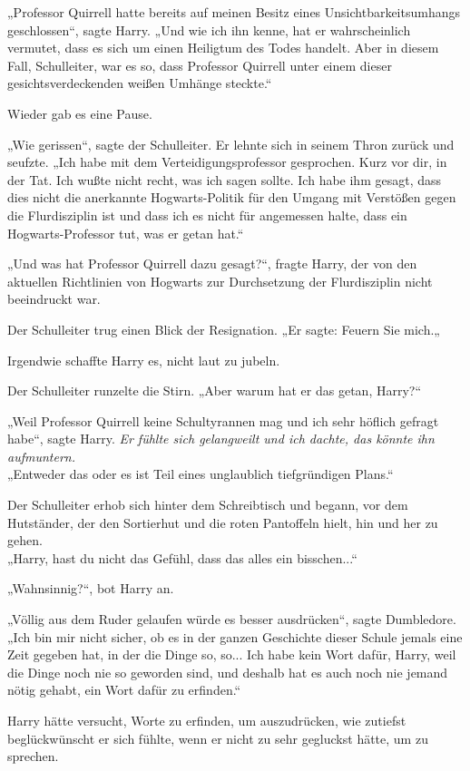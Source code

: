 {„Professor Quirrell hatte bereits auf meinen Besitz eines Unsichtbarkeitsumhangs geschlossen“, sagte Harry. „Und wie ich ihn kenne, hat er wahrscheinlich vermutet, dass es sich um einen Heiligtum des Todes handelt. Aber in diesem Fall, Schulleiter, war es so, dass Professor Quirrell unter einem dieser gesichtsverdeckenden weißen Umhänge steckte.“

Wieder gab es eine Pause.

„Wie gerissen“, sagte der Schulleiter. Er lehnte sich in seinem Thron zurück und seufzte. „Ich habe mit dem Verteidigungsprofessor gesprochen. Kurz vor dir, in der Tat. Ich wußte nicht recht, was ich sagen sollte. Ich habe ihm gesagt, dass dies nicht die anerkannte Hogwarts-Politik für den Umgang mit Verstößen gegen die Flurdisziplin ist und dass ich es nicht für angemessen halte, dass ein Hogwarts-Professor tut, was er getan hat.“

„Und was hat Professor Quirrell dazu gesagt?“, fragte Harry, der von den aktuellen Richtlinien von Hogwarts zur Durchsetzung der Flurdisziplin nicht beeindruckt war.

Der Schulleiter trug einen Blick der Resignation. „Er sagte: Feuern Sie mich.„

Irgendwie schaffte Harry es, nicht laut zu jubeln.

Der Schulleiter runzelte die Stirn. „Aber warum hat er das getan, Harry?“

„Weil Professor Quirrell keine Schultyrannen mag und ich sehr höflich gefragt habe“, sagte Harry. \emph{Er fühlte sich gelangweilt und ich dachte, das könnte ihn aufmuntern.}\\ „Entweder das oder es ist Teil eines unglaublich tiefgründigen Plans.“

Der Schulleiter erhob sich hinter dem Schreibtisch und begann, vor dem Hutständer, der den Sortierhut und die roten Pantoffeln hielt, hin und her zu gehen.\\ „Harry, hast du nicht das Gefühl, dass das alles ein bisschen...“

„Wahnsinnig?“, bot Harry an.

„Völlig aus dem Ruder gelaufen würde es besser ausdrücken“, sagte Dumbledore. „Ich bin mir nicht sicher, ob es in der ganzen Geschichte dieser Schule jemals eine Zeit gegeben hat, in der die Dinge so, so... Ich habe kein Wort dafür, Harry, weil die Dinge noch nie so geworden sind, und deshalb hat es auch noch nie jemand nötig gehabt, ein Wort dafür zu erfinden.“

Harry hätte versucht, Worte zu erfinden, um auszudrücken, wie zutiefst beglückwünscht er sich fühlte, wenn er nicht zu sehr gegluckst hätte, um zu sprechen.

}
